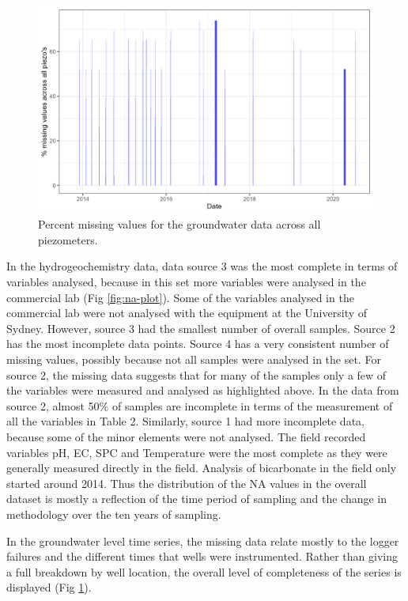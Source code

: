 \documentclass[, manuscript]{copernicus}
\begin{document}
\begin{figure}
\includegraphics[width=0.9\linewidth]{Figures/na_GW} \caption{Percent missing values for the groundwater data across all piezometers.}\label{fig:gw-na-plot}
\end{figure}

In the hydrogeochemistry data, data source 3 was the most complete in
terms of variables analysed, because in this set more variables were
analysed in the commercial lab (Fig \ref{fig:na-plot}). Some of the
variables analysed in the commercial lab were not analysed with the
equipment at the University of Sydney. However, source 3 had the
smallest number of overall samples. Source 2 has the most incomplete
data points. Source 4 has a very consistent number of missing values,
possibly because not all samples were analysed in the set. For source 2,
the missing data suggests that for many of the samples only a few of the
variables were measured and analysed as highlighted above. In the data
from source 2, almost 50\% of samples are incomplete in terms of the
measurement of all the variables in Table 2. Similarly, source 1 had
more incomplete data, because some of the minor elements were not
analysed. The field recorded variables pH, EC, SPC and Temperature were
the most complete as they were generally measured directly in the field.
Analysis of bicarbonate in the field only started around 2014. Thus the
distribution of the NA values in the overall dataset is mostly a
reflection of the time period of sampling and the change in methodology
over the ten years of sampling.

In the groundwater level time series, the missing data relate mostly to
the logger failures and the different times that wells were
instrumented. Rather than giving a full breakdown by well location, the
overall level of completeness of the series is displayed (Fig
\ref{fig:gw-na-plot}).
\end{document}
